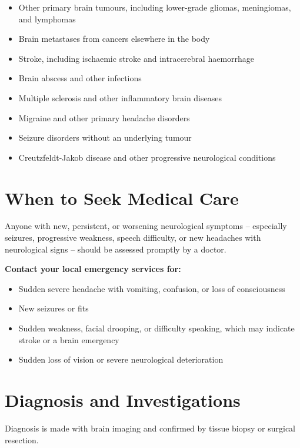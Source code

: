 \begin{itemize}
    \item Other primary brain tumours, including lower-grade gliomas, meningiomas, and lymphomas
    \item Brain metastases from cancers elsewhere in the body
    \item Stroke, including ischaemic stroke and intracerebral haemorrhage
    \item Brain abscess and other infections
    \item Multiple sclerosis and other inflammatory brain diseases
    \item Migraine and other primary headache disorders
    \item Seizure disorders without an underlying tumour
    \item Creutzfeldt-Jakob disease and other progressive neurological conditions
\end{itemize}

\section*{When to Seek Medical Care}
Anyone with new, persistent, or worsening neurological symptoms -- especially seizures, progressive weakness, speech difficulty, or new headaches with neurological signs -- should be assessed promptly by a doctor.

\textbf{Contact your local emergency services for:}
\begin{itemize}
    \item Sudden severe headache with vomiting, confusion, or loss of consciousness
    \item New seizures or fits
    \item Sudden weakness, facial drooping, or difficulty speaking, which may indicate stroke or a brain emergency
    \item Sudden loss of vision or severe neurological deterioration
\end{itemize}

\section*{Diagnosis and Investigations}
Diagnosis is made with brain imaging and confirmed by tissue biopsy or surgical resection.

